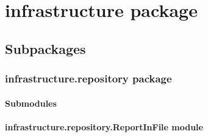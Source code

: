 \documentclass[letterpaper,10pt,english]{sphinxmanual}
\begin{document}
\section{infrastructure package}
\label{\detokenize{infrastructure:infrastructure-package}}\label{\detokenize{infrastructure::doc}}

\subsection{Subpackages}
\label{\detokenize{infrastructure:subpackages}}
\sphinxstepscope


\subsubsection{infrastructure.repository package}
\label{\detokenize{infrastructure.repository:infrastructure-repository-package}}\label{\detokenize{infrastructure.repository::doc}}

\paragraph{Submodules}
\label{\detokenize{infrastructure.repository:submodules}}

\paragraph{infrastructure.repository.ReportInFile module}
\label{\detokenize{infrastructure.repository:module-infrastructure.repository.ReportInFile}}\label{\detokenize{infrastructure.repository:infrastructure-repository-reportinfile-module}}
\end{document}
